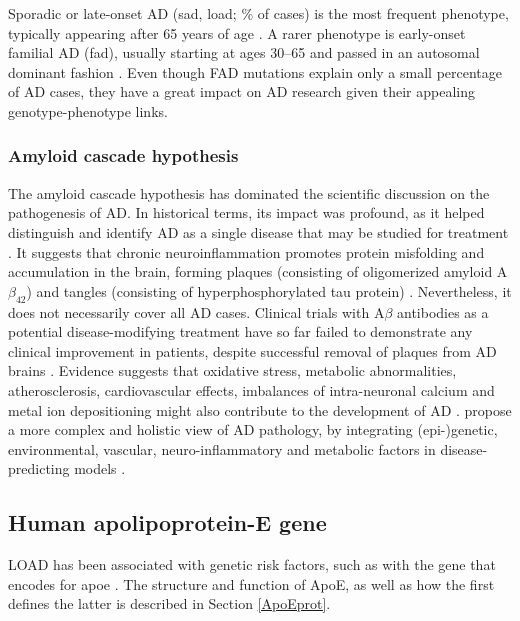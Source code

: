 \documentclass{amsart}
\begin{document}
Sporadic or late-onset AD (\acrshort{sad}, \acrshort{load}; \% of cases) is the most frequent phenotype, typically appearing after 65 years of age \cite{Beydoun2014EpidemiologicMeta-analysis}. A rarer phenotype is early-onset familial AD (\acrshort{fad}), usually starting at ages 30–65 and passed in an autosomal dominant fashion \cite{VanCauwenberghe2015ThePerspectives}.
Even though FAD mutations explain only a small percentage of AD cases, they have a great impact on AD research given their appealing genotype-phenotype links.

\subsubsection{Amyloid cascade hypothesis}
The amyloid cascade hypothesis has dominated the scientific discussion on the pathogenesis of AD. In historical terms, its impact was profound, as it helped distinguish and identify AD as a single disease that may be studied for treatment \cite{Hardy2006AlzheimersReappraisal}. It suggests that chronic neuroinflammation promotes protein misfolding and accumulation in the brain, forming plaques (consisting of oligomerized amyloid A$\beta_{42}$) and tangles (consisting of hyperphosphorylated tau protein) \cite{Edwards2019ANeurodegeneration}. Nevertheless, it does not necessarily cover all AD cases. Clinical trials with A$\beta$ antibodies as a potential disease-modifying treatment have so far failed to demonstrate any clinical improvement in patients, despite successful removal of plaques from AD brains \cite{Kepp2023TheReview,Kurkinen2023TheThinking}. Evidence suggests that oxidative stress, metabolic abnormalities, atherosclerosis, cardiovascular effects, imbalances of intra-neuronal calcium and metal ion depositioning might also contribute to the development of AD \cite{Kepp2023TheReview}. \citeauthor{Kepp2023TheReview} propose a more complex and holistic view of AD pathology, by integrating (epi-)genetic, environmental, vascular, neuro-inflammatory and metabolic factors in disease-predicting models \cite{Kepp2023TheReview}.

\subsection{Human apolipoprotein-E gene}
LOAD has been associated with genetic risk factors, such as with the gene that encodes for \acrfull{apoe} \cite{Corder1993GeneFamilies}. The structure and function of ApoE, as well as how the first defines the latter is described in Section \ref{ApoEprot}.
\end{document}
